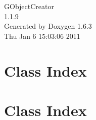 \documentclass[a4paper]{book}
\begin{document}
\hypersetup{pageanchor=false}
\begin{titlepage}
\vspace*{7cm}
\begin{center}
{\Large GObjectCreator \\[1ex]\large 1.1.9 }\\
\vspace*{1cm}
{\large Generated by Doxygen 1.6.3}\\
\vspace*{0.5cm}
{\small Thu Jan 6 15:03:06 2011}\\
\end{center}
\end{titlepage}
\clearemptydoublepage
{}
\tableofcontents
\clearemptydoublepage
{}
\hypersetup{pageanchor=true}
\chapter{Class Index}

\chapter{Class Index}

\end{document}
